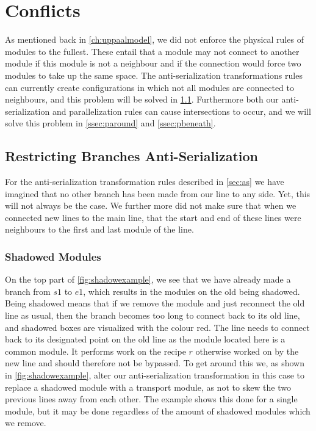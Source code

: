\section{Conflicts}\label{ssec:conflicts}
As mentioned back in \cref{ch:uppaalmodel}, we did not enforce the physical rules of modules to the fullest. These entail that a module may not connect to another module if this module is not a neighbour and if the connection would force two modules to take up the same space. The anti-serialization transformations rules can currently create configurations in which not all modules are connected to neighbours, and this problem will be solved in \cref{ssec:restrictbranch}. Furthermore both our anti-serialization and parallelization rules can cause intersections to occur, and we will solve this problem in \cref{ssec:paround} and \cref{ssec:pbeneath}.


\subsection{Restricting Branches Anti-Serialization}\label{ssec:restrictbranch}
For the anti-serialization transformation rules described in \cref{sec:as} we have imagined that no other branch has been made from our line to any side. Yet, this will not always be the case. We further more did not make sure that when we connected new lines to the main line, that the start and end of these lines were neighbours to the first and last module of the line.

\subsubsection{Shadowed Modules}
On the top part of \cref{fig:shadowexample}, we see that we have already made a branch from $s1$ to $e1$, which results in the modules on the old being shadowed. Being shadowed means that if we remove the module and just reconnect the old line as usual, then the branch becomes too long to connect back to its old line, and shadowed boxes are visualized with the colour red. The line needs to connect back to its designated point on the old line as the module located here is a common module. It performs work on the recipe $r$ otherwise worked on by the new line and should therefore not be bypassed.  To get around this we, as shown in \cref{fig:shadowexample}, alter our anti-serialization transformation in this case to replace a shadowed module with a transport module, as not to skew the two previous lines away from each other. The example shows this done for a single module, but it may be done regardless of the amount of shadowed modules which we remove.


